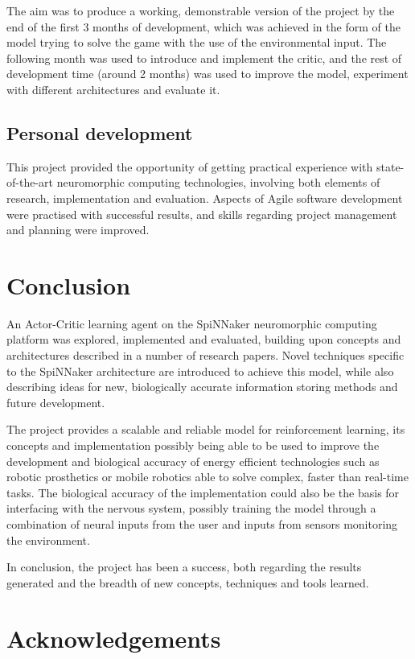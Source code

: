 \documentclass[10pt]{article}
\begin{document}
    The aim was to produce a working, demonstrable version of the project by the end of the first 3 months of development, which was achieved in the form of the model trying to solve the game with the use of the environmental input. The following month was used to introduce and implement the critic, and the rest of development time (around 2 months) was used to improve the model, experiment with different architectures and evaluate it.

    \subsection{Personal development}

    This project provided the opportunity of getting practical experience with state-of-the-art neuromorphic computing technologies, involving both elements of research, implementation and evaluation. Aspects of Agile software development were practised with successful results, and skills regarding project management and planning were improved.
    
    \section{Conclusion}

    An Actor-Critic learning agent on the SpiNNaker neuromorphic computing platform was explored, implemented and evaluated, building upon concepts and architectures described in a number of research papers. Novel techniques specific to the SpiNNaker architecture are introduced to achieve this model, while also describing ideas for new, biologically accurate information storing methods and future development.

    The project provides a scalable and reliable model for reinforcement learning, its concepts and implementation possibly being able to be used to improve the development and biological accuracy of energy efficient technologies such as robotic prosthetics or mobile robotics able to solve complex, faster than real-time tasks. The biological accuracy of the implementation could also be the basis for interfacing with the nervous system, possibly training the model through a combination of neural inputs from the user and inputs from sensors monitoring the environment.

    In conclusion, the project has been a success, both regarding the results generated and the breadth of new concepts, techniques and tools learned.

    \section*{Acknowledgements}
\end{document}
